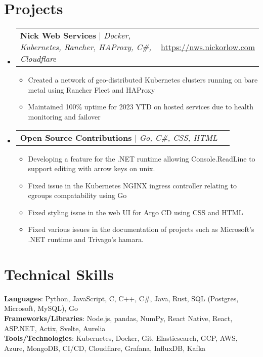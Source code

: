 \documentclass[letterpaper,11pt]{article}
\makeatletter
\newcommand{\resumeItem}[1]{
  \item\small{
    {#1 \vspace{-2pt}}
  }
}
\newcommand{\resumeProjectHeading}[2]{
    \item
    \begin{tabular*}{0.97\textwidth}{l@{\extracolsep{\fill}}r}
      \small#1 & \underline{\href{#2}{#2}} \\
    \end{tabular*}\vspace{-7pt}
}
\newcommand{\resumeSubHeadingListStart}{\begin{itemize}[leftmargin=0.15in, label={}]}
\newcommand{\resumeSubHeadingListEnd}{\end{itemize}}
\newcommand{\resumeItemListStart}{\begin{itemize}}
\newcommand{\resumeItemListEnd}{\end{itemize}\vspace{-3pt}}
\makeatother
\begin{document}
\section{Projects}
    \resumeSubHeadingListStart
      \resumeProjectHeading
          {\textbf{Nick Web Services} $|$ \emph{Docker, Kubernetes, Rancher, HAProxy, C\#, Cloudflare}}{https://nws.nickorlow.com}
          \resumeItemListStart
            \resumeItem{Created a network of geo-distributed Kubernetes clusters running on bare metal using Rancher Fleet and HAProxy}
            \resumeItem{Maintained 100\% uptime for 2023 YTD on hosted services due to health monitoring and failover}
          \resumeItemListEnd
          \resumeProjectHeading
          {\textbf{Open Source Contributions} $|$ \emph{Go, C\#, CSS, HTML}}{}
          \resumeItemListStart
            \resumeItem{Developing a feature for the .NET runtime allowing Console.ReadLine to support editing with arrow keys on unix.}
            \resumeItem{Fixed issue in the Kubernetes NGINX ingress controller relating to cgroups compatability using Go}
            \resumeItem{Fixed styling issue in the web UI for Argo CD using CSS and HTML}
            \resumeItem{Fixed various issues in the documentation of projects such as Microsoft's .NET runtime and Trivago's hamara.}
          \resumeItemListEnd
    \resumeSubHeadingListEnd

\section{Technical Skills}
 \begin{itemize}[leftmargin=0.15in, label={}]
    \small{\item{
     \textbf{Languages}{:  Python, JavaScript, C, C++, C\#, Java, Rust, SQL (Postgres, Microsoft, MySQL), Go} \\
     \textbf{Frameworks/Libraries}{: Node.js, pandas, NumPy, React Native, React, ASP.NET, Actix, Svelte, Aurelia} \\
     \textbf{Tools/Technologies}{: Kubernetes, Docker, Git, Elasticsearch, GCP, AWS, Azure, MongoDB, CI/CD, Cloudflare, Grafana, InfluxDB, Kafka} \\
    }}
 \end{itemize}


\end{document}
